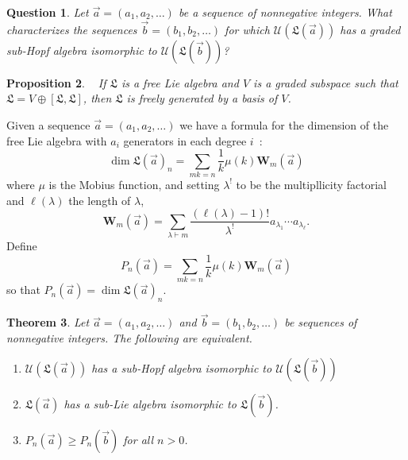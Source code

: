 \documentclass[11pt]{amsart}
\newtheorem{theorem}{Theorem}[section]
\newtheorem{proposition}[theorem]{Proposition}
\newtheorem{question}[theorem]{Question}
\theoremstyle{definition}
\numberwithin{equation}{section}
\begin{document}
\begin{question}
Let $\vec{a} = (a_{1}, a_{2}, \ldots)$ be a sequence of nonnegative integers.  What characterizes the sequences $\vec{b} = (b_{1}, b_{2}, \ldots)$ for which $\mathcal{U}(\mathfrak{L}(\vec{a}))$ has a graded sub-Hopf algebra isomorphic to $\mathcal{U}(\mathfrak{L}(\vec{b}))$?
\end{question}

\begin{proposition}~\cite[Prop 2.2]{F23} 
    If $\mathfrak{L}$ is a free Lie algebra and $V$ is a graded subspace such that $\mathfrak{L} = V \oplus [\mathfrak{L},\mathfrak{L}]$, then $\mathfrak{L}$ is freely generated by a basis of $V$.
\end{proposition}

Given a sequence $\vec{a} = (a_1,a_2, \ldots)$ we have a formula for the dimension of the free Lie algebra with $a_i$ generators in each degree $i$~\cite[Theorem 2.2]{KK95}:
\[
\dim \mathfrak{L}(\vec{a})_n = \sum_{mk=n} \frac{1}{k}\mu (k) \mathbf{W}_m(\vec{a})
\]
where $\mu$ is the Mobius function, and setting $\lambda^!$ to be the multipllicity factorial and $\ell(\lambda)$ the length of $\lambda$,
\[
\mathbf{W}_m(\vec{a}) = \sum_{\lambda \vdash m} \frac{(\ell(\lambda)-1)!}{\lambda^!}a_{\lambda_1} \cdots a_{\lambda_{\ell}}.
\]
Define 
\[
P_n(\vec{a}) = \sum_{mk=n} \frac{1}{k}\mu (k) \mathbf{W}_m(\vec{a})
\]
so that $P_n(\vec{a}) = \dim \mathfrak{L}(\vec{a})_n$.

\begin{theorem}
    Let $\vec{a} = (a_{1}, a_{2}, \ldots)$ and $\vec{b} = (b_{1}, b_{2}, \ldots)$ be sequences of nonnegative integers. The following are equivalent.
    \begin{enumerate}
        \item $\mathcal{U}(\mathfrak{L}(\vec{a}))$ has a sub-Hopf algebra isomorphic to $\mathcal{U}(\mathfrak{L}(\vec{b}))$
        \item $\mathfrak{L}(\vec{a})$ has a sub-Lie algebra isomorphic to $\mathfrak{L}(\vec{b})$.
        \item $P_n(\vec{a}) \geq P_n(\vec{b})$ for all $n > 0$.
    \end{enumerate}
\end{theorem}
\end{document}
